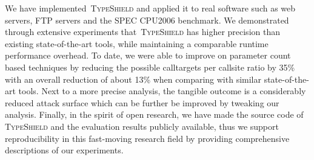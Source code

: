 We have implemented~\textsc{TypeShield} and applied it to real software such as web servers, FTP servers and the SPEC CPU2006 benchmark. 
We demonstrated through extensive experiments that~\textsc{TypeShield} has 
higher precision than existing state-of-the-art tools, while maintaining a comparable runtime performance overhead. 
To date, we were able to improve on parameter count based techniques by reducing the possible calltargets per 
callsite ratio by 35\% with an overall reduction of about 13\% when comparing with similar state-of-the-art tools. 
Next to a more precise analysis, the tangible outcome is a considerably reduced attack surface which can be further be improved by 
tweaking our analysis.
Finally, in the spirit of open research, we have made the source code of \textsc{TypeShield} and the evaluation results publicly available, 
thus we support reproducibility in this fast-moving research field by providing comprehensive descriptions of our experiments.


